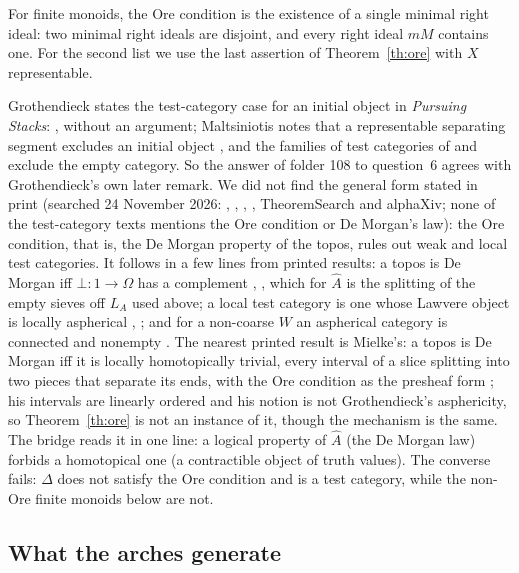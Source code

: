 For finite monoids, the Ore condition is the existence of a single minimal right ideal: two minimal right ideals are disjoint, and every right ideal $mM$ contains one. For the second list we use the last assertion of Theorem~\ref{th:ore} with $X$ representable.

\status{} Grothendieck states the test-category case for an initial object in \emph{Pursuing Stacks}:  \cite[\S88, typescript p.~294]{ps-arxiv}, without an argument; Maltsiniotis notes that a representable separating segment excludes an initial object \cite[Rem.~6.8]{maltsiniotis-2001}, and the families of test categories of \cite[Ex.~4.1.20]{cisinski-308} and \cite[Ex.~6.9]{maltsiniotis-2001} exclude the empty category. So the answer  of folder 108 to question~6 agrees with Grothendieck's own later remark. We did not find the general form stated in print (searched 24 November 2026: \cite{cisinski-308}, \cite{maltsiniotis-301}, \cite{ps-arxiv}, \cite{hubert-thesis}, TheoremSearch and alphaXiv; none of the test-category texts mentions the Ore condition or De Morgan's law): the Ore condition, that is, the De Morgan property of the topos, rules out weak and local test categories. It follows in a few lines from printed results: a topos is De Morgan iff $\bot\colon 1\to\Omega$ has a complement \cite[\S1]{caramello-demorgan}, \cite[Prop.~6 (iii), Prop.~14]{caramello-chamoun}, which for $\widehat A$ is the splitting of the empty sieves off $L_A$ used above; a local test category is one whose Lawvere object is locally aspherical \cite[Th.~4.1.19]{cisinski-308}, \cite[Th.~1.5.6]{maltsiniotis-301}; and for a non-coarse $W$ an aspherical category is connected and nonempty \cite[Lemme~1.7.22]{maltsiniotis-301}. The nearest printed result is Mielke's: a topos is De Morgan iff it is locally homotopically trivial, every interval of a slice splitting into two pieces that separate its ends, with the Ore condition as the presheaf form \cite[Th.~1.5, Cor.~1.6]{mielke}; his intervals are linearly ordered and his notion is not Grothendieck's asphericity, so Theorem~\ref{th:ore} is not an instance of it, though the mechanism is the same. The bridge reads it in one line: a logical property of $\widehat A$ (the De Morgan law) forbids a homotopical one (a contractible object of truth values). The converse fails: $\Delta$ does not satisfy the Ore condition and is a test category, while the non-Ore finite monoids below are not.

\subsection{What the arches generate}

